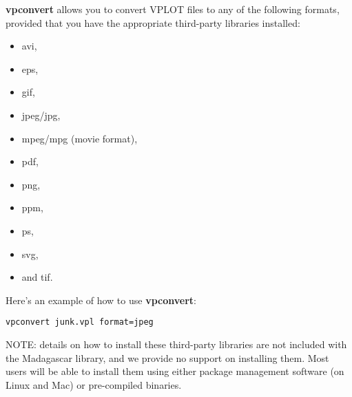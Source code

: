 \textbf{vpconvert} allows you to convert VPLOT files to any of the following formats, provided that you have the appropriate third-party libraries installed: 
\begin{itemize}
\item avi, 
\item eps,
\item gif, 
\item jpeg/jpg,
\item mpeg/mpg (movie format),
\item pdf,
\item png,
\item ppm,
\item ps,
\item svg,
\item and tif.
\end{itemize}
Here's an example of how to use \textbf{vpconvert}:
\begin{verbatim}
vpconvert junk.vpl format=jpeg
\end{verbatim}

NOTE: details on how to install these third-party libraries are not included with the Madagascar library, and we provide no support on installing them.  Most users will be able to install them using either package management software (on Linux and Mac) or pre-compiled binaries.
